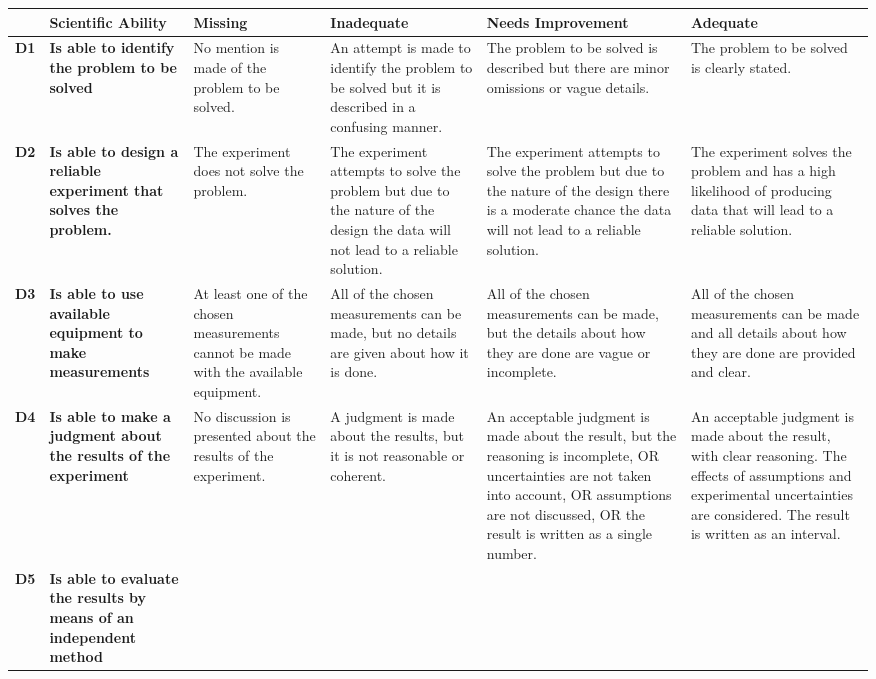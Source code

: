 \begin{landscape}
\begin{longtable}{>{\bfseries}p{0.02\textheight}|>{\bfseries\RaggedRight}p{0.25\textheight}|>{\RaggedRight}p{0.21\textheight}|>{\RaggedRight}p{0.21\textheight}|>{\RaggedRight}p{0.22\textheight}|>{\RaggedRight}p{0.22\textheight}}
	\toprule
	& Scientific Ability
	& Missing & Inadequate & Needs Improvement & Adequate \\ \midrule \endhead
	D1
	& Is able to identify the problem to be solved
	& No mention is made of the problem to be solved.
	& An attempt is made to identify the problem to be solved but it is described in a confusing manner.
	& The problem to be solved is described but there are minor omissions or vague details.
	& The problem to be solved is clearly stated.
	\\ \midrule
	D2
	& Is able to design a reliable experiment that solves the problem.
	& The experiment does not solve the problem.
	& The experiment attempts to solve the problem but due to the nature of the design the data will not lead to a reliable solution.
	& The experiment attempts to solve the problem but due to the nature of the design there is a moderate chance the data will not lead to a reliable solution.
	& The experiment solves the problem and has a high likelihood of producing data that will lead to a reliable solution.
	\\ \midrule
	D3
	& Is able to use available equipment to make measurements
	& At least one of the chosen measurements cannot be made with the available equipment.
	& All of the chosen measurements can be made, but no details are given about how it is done.
	& All of the chosen measurements can be made, but the details about how they are done are vague or incomplete.
	& All of the chosen measurements can be made and all details about how they are done are provided and clear.
	\\ \midrule
	D4
	& Is able to make a judgment about the results of the experiment
	& No discussion is presented about the results of the experiment.
	& A judgment is made about the results, but it is not reasonable or coherent.
	& An acceptable judgment is made about the result, but the reasoning is incomplete, OR uncertainties are not taken into account, OR assumptions are not discussed, OR the result is written as a single number.
	& An acceptable judgment is made about the result, with clear reasoning. The effects of assumptions and experimental uncertainties are considered. The result is written as an interval.
	\\ \midrule
	D5
	& Is able to evaluate the results by means of an independent method

\end{longtable}
\end{landscape}
